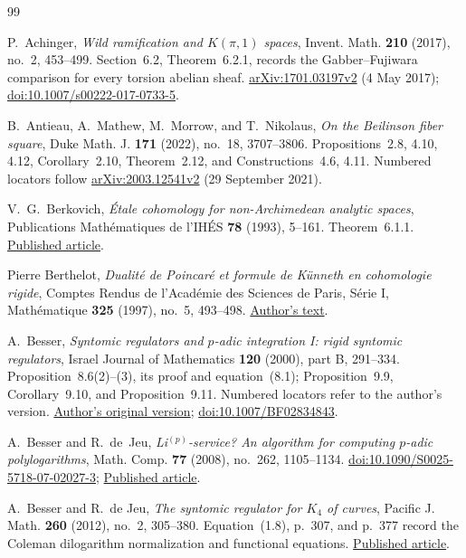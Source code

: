 \begin{thebibliography}{99}

P.~Achinger, \emph{Wild ramification and $K(\pi,1)$ spaces},
Invent. Math. \textbf{210} (2017), no.~2, 453--499.
Section~6.2, Theorem~6.2.1, records the Gabber--Fujiwara comparison
for every torsion abelian sheaf.
\href{https://arxiv.org/abs/1701.03197v2}{arXiv:1701.03197v2}
(4 May 2017);
\href{https://doi.org/10.1007/s00222-017-0733-5}{doi:10.1007/s00222-017-0733-5}.

B.~Antieau, A.~Mathew, M.~Morrow, and T.~Nikolaus,
\emph{On the Beilinson fiber square},
Duke Math. J. \textbf{171} (2022), no.~18, 3707--3806.
Propositions~2.8, 4.10, 4.12, Corollary~2.10, Theorem~2.12,
and Constructions~4.6, 4.11.
Numbered locators follow
\href{https://arxiv.org/abs/2003.12541v2}{arXiv:2003.12541v2}
(29 September 2021).

V.~G.~Berkovich, \emph{\'Etale cohomology for non-Archimedean analytic spaces},
Publications Math\'ematiques de l'IH\'ES \textbf{78} (1993), 5--161.
Theorem~6.1.1.
\href{https://www.numdam.org/article/PMIHES_1993__78__5_0.pdf}{Published article}.

Pierre Berthelot,
\emph{Dualit\'e de Poincar\'e et formule de K\"unneth en cohomologie rigide},
Comptes Rendus de l'Acad\'emie des Sciences de Paris,
S\'erie I, Math\'ematique \textbf{325} (1997), no.~5, 493--498.
\href{https://wstein.org/people/berthelo/publis/Poincare_Kunneth.pdf}{Author's text}.

A.~Besser, \emph{Syntomic regulators and $p$-adic integration I:
rigid syntomic regulators}, Israel Journal of Mathematics
\textbf{120} (2000), part B, 291--334.
Proposition~8.6(2)--(3), its proof and equation~(8.1);
Proposition~9.9, Corollary~9.10, and Proposition~9.11.
Numbered locators refer to the author's version.
\href{https://www.math.bgu.ac.il/~bessera/reg/reg.html}{Author's original version};
\href{https://doi.org/10.1007/BF02834843}{doi:10.1007/BF02834843}.

A.~Besser and R.~de~Jeu, \emph{Li$^{(p)}$-service? An algorithm for computing $p$-adic polylogarithms}, Math. Comp. \textbf{77} (2008), no.~262, 1105--1134.
\href{https://doi.org/10.1090/S0025-5718-07-02027-3}{doi:10.1090/S0025-5718-07-02027-3};
\href{https://research.vu.nl/ws/portalfiles/portal/2459860/220267.pdf}{Published article}.

A.~Besser and R.~de Jeu, \emph{The syntomic regulator for $K_4$ of curves}, Pacific J. Math. \textbf{260} (2012), no.~2, 305--380. Equation~(1.8), p.~307, and p.~377 record the Coleman dilogarithm normalization and functional equations.
\href{https://msp.org/pjm/2012/260-2/pjm-v260-n2-p03-s.pdf}{Published article}.


\end{thebibliography}
